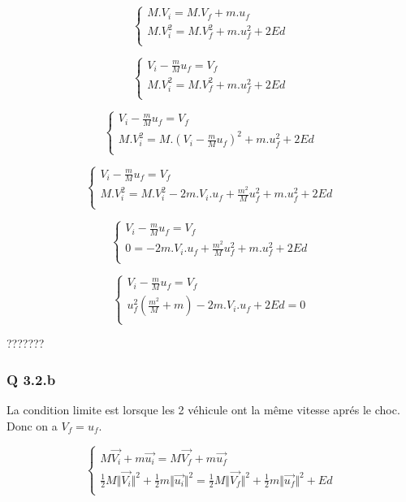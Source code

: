 \documentclass[]{book}
\theoremstyle{definition}
\begin{document}
$$
\left\{ 
\begin{array}{l}
 M.V_i = M.V_f + m.u_f \\
 M.V_i^2  = M.V_f^2 + m.u_f^2 + 2Ed\\
\end{array}
\right. 
$$

$$
\left\{ 
\begin{array}{l}
 V_i - \frac{m}{M}u_f = V_f  \\
 M.V_i^2  = M.V_f^2 + m.u_f^2 + 2Ed\\
\end{array}
\right. 
$$

$$
\left\{ 
\begin{array}{l}
 V_i - \frac{m}{M}u_f = V_f  \\
 M.V_i^2  = M.(V_i - \frac{m}{M}u_f)^2 + m.u_f^2 + 2Ed\\
\end{array}
\right. 
$$

$$
\left\{ 
\begin{array}{l}
 V_i - \frac{m}{M}u_f = V_f  \\
 M.V_i^2  = M.V_i^2 - 2m.V_i.u_f + \frac{m^2}{M}u_f^2 + m.u_f^2 + 2Ed\\
\end{array}
\right. 
$$

$$
\left\{ 
\begin{array}{l}
 V_i - \frac{m}{M}u_f = V_f  \\
 0 = - 2m.V_i.u_f + \frac{m^2}{M}u_f^2 + m.u_f^2 + 2Ed\\
\end{array}
\right. 
$$

$$
\left\{ 
\begin{array}{l}
 V_i - \frac{m}{M}u_f = V_f  \\
 u_f^2(\frac{m^2}{M} + m) - 2m.V_i.u_f + 2Ed = 0\\
\end{array}
\right. 
$$

???????


\subsubsection*{Q 3.2.b}
La condition limite est lorsque les 2 v\'ehicule ont la m\^eme vitesse apr\'es le choc. Donc on a $V_f = u_f$.

$$
\left\{ 
\begin{array}{l}
 M\overrightarrow{V_i} + m\overrightarrow{u_i} = M\overrightarrow{V_f} + m\overrightarrow{u_f} \\
 \frac{1}{2}M\Vert \overrightarrow{V_i} \Vert^2 + \frac{1}{2}m\Vert \overrightarrow{u_i} \Vert^2 = \frac{1}{2}M\Vert \overrightarrow{V_f} \Vert^2 + \frac{1}{2}m\Vert \overrightarrow{u_f} \Vert^2 + Ed\\
\end{array}
\right. 
$$
\end{document}
